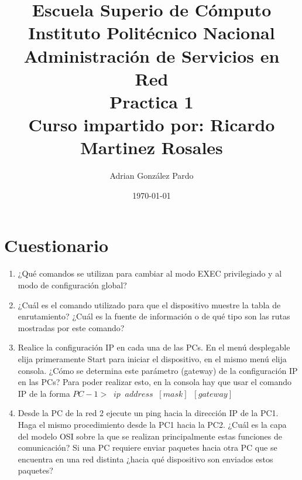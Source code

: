 \documentclass[10pt]{article}
\title{Escuela Superio de Cómputo\\Instituto Politécnico Nacional\\Administración de Servicios en Red\\Practica 1\\Curso impartido por: Ricardo Martinez Rosales}
\author{Adrian González Pardo}
\date{\today}
\begin{document}
\maketitle
\section{Cuestionario}
\begin{enumerate}
  \item ¿Qué comandos se utilizan para cambiar al modo EXEC privilegiado y al modo de configuración global?
  \item ¿Cuál es el comando utilizado para que el dispositivo muestre la tabla de enrutamiento?
   ¿Cuál es la fuente de información o de qué tipo son las rutas mostradas por este comando?
  \item Realice la configuración IP en cada una de las PCs. En el menú desplegable elija primeramente Start para iniciar el dispositivo, en el mismo menú elija consola. ¿Cómo se determina este parámetro (gateway) de la configuración IP en las PCs? Para poder realizar esto, en la consola hay que usar el comando IP de la forma $PC-1>\;\;ip\;\;address\;\;[mask]\;\;[gateway]$
  \item Desde la PC de la red 2 ejecute un ping hacia la dirección IP de la PC1. Haga el mismo procedimiento desde la PC1 hacia la PC2. ¿Cuál es la capa del modelo OSI sobre la que se realizan principalmente estas funciones de comunicación? Si una PC requiere enviar paquetes hacia otra PC que se encuentra en una red distinta ¿hacia qué dispositivo son enviados estos paquetes?
\end{enumerate}
\end{document}
